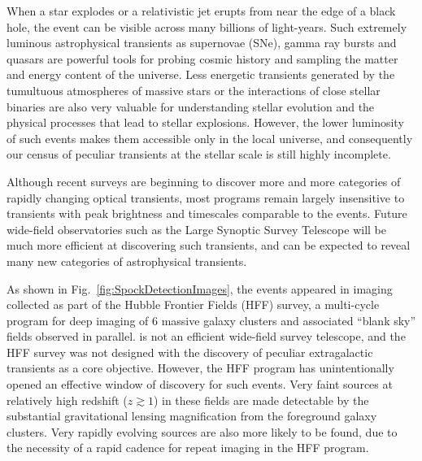 
 When a star explodes or a relativistic jet erupts from near the edge
of a black hole, the event can be visible across many billions of
light-years.  Such extremely luminous astrophysical transients as
supernovae (SNe), gamma ray bursts and quasars are powerful tools for
probing cosmic history and sampling the matter and energy content of
the universe.  Less energetic transients generated by the tumultuous
atmospheres of massive stars or the interactions of close stellar
binaries are also very valuable for understanding stellar evolution
and the physical processes that lead to stellar explosions.  However,
the lower luminosity of such events makes them accessible only in
the local universe, and consequently our census of peculiar transients
at the stellar scale is still highly incomplete.


Although recent surveys are beginning to discover more and more
categories of rapidly changing optical
transients\cite{Kasliwal:2011a,Drout:2014}, most programs remain
largely insensitive to transients with peak brightness and timescales
comparable to the \spock events\cite{Berger:2013b}.  Future wide-field
observatories such as the Large Synoptic Survey
Telescope\cite{Tyson:2002} will be much more efficient at discovering
such transients, and can be expected to reveal many new categories of
astrophysical transients.

As shown in Fig.~\ref{fig:SpockDetectionImages}, the \spock events
appeared in \HST imaging collected as part of
the Hubble Frontier Fields (HFF) survey\cite{Lotz:2017}, a multi-cycle
program for deep imaging of 6 massive galaxy clusters and associated
``blank sky'' fields observed in parallel.  \HST is not an efficient
wide-field survey telescope, and the HFF survey was not designed with
the discovery of peculiar extragalactic transients as a core
objective.  However, the HFF program has unintentionally opened an
effective window of discovery for such events.  Very faint sources at
relatively high redshift ($z\gtrsim1$) in these fields are made
detectable by the substantial gravitational lensing magnification from
the foreground galaxy clusters.  Very rapidly evolving sources are
also more likely to be found, due to the necessity of a rapid cadence
for repeat imaging in the HFF program.

